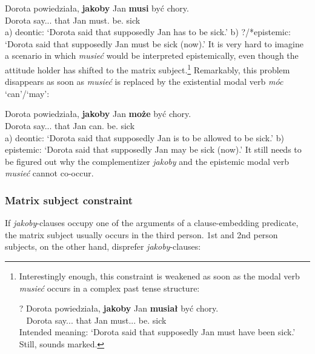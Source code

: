 \documentclass[output=paper
,modfonts
,nonflat]{langsci/langscibook}
\begin{document}
\ea \gll Dorota powiedziała, \textbf{jakoby} Jan \textbf{musi} być chory. \\
		Dorota say.{\lptcp}.{\sg}.{\fem} that Jan must.{\thirdperson}{\sg} be.{\infv} sick \\
\glt	a) deontic: `Dorota said that supposedly Jan has to be sick.'
\glt	b) ?/*epistemic: `Dorota said that supposedly Jan must be sick (now).'
\z
It is very hard to imagine a scenario in which \emph{musieć} would be interpreted epistemically, even though the attitude holder has shifted to the matrix subject.\footnote{Interestingly enough, this constraint is weakened as soon as the modal verb \emph{musieć} occurs in a complex past tense structure:

\ea \gll ? Dorota powiedziała, \textbf{jakoby} Jan \textbf{musiał} być chory. \label{bluh} \\
	 ~	Dorota say.{\lptcp}.{\sg}.{\fem} that Jan must.{\lptcp}.{\sg}.{\masc} be.{\infv} sick \\
\glt	Intended meaning: `Dorota said that supposedly Jan must have been sick.'
\z
Still,  sounds marked.
}
 Remarkably, this problem disappears as soon as \emph{musieć} is replaced by the existential modal verb \emph{móc} `can'\slash `may':

\ea \gll Dorota powiedziała, \textbf{jakoby} Jan \textbf{może} być chory. \\
		Dorota say.{\lptcp}.{\sg}.{\fem} that Jan can.{\thirdperson}{\sg} be.{\infv} sick \\
\glt	a) deontic: `Dorota said that supposedly Jan is to be allowed to be sick.'
\glt	b) epistemic: `Dorota said that supposedly Jan may be sick (now).'
\z
It still needs to be figured out why the complementizer \emph{jakoby} and the epistemic modal verb \emph{musieć} cannot co-occur.

\subsubsection{Matrix subject constraint}
If \emph{jakoby}-clauses occupy one of the arguments of a clause-embedding predicate, the matrix subject usually occurs in the third person. 1st and 2nd person subjects, on the other hand, disprefer \emph{jakoby}-clauses:
\end{document}
